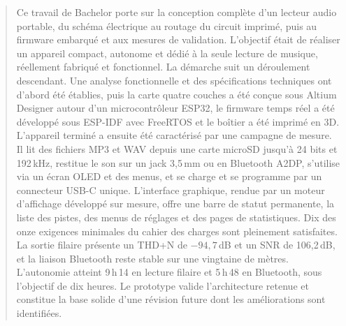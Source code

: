 \begin{abstract}

    Ce travail de Bachelor porte sur la conception complète d'un lecteur audio portable, du schéma électrique au routage du circuit imprimé, puis au firmware embarqué et aux mesures de validation. L'objectif était de réaliser un appareil compact, autonome et dédié à la seule lecture de musique, réellement fabriqué et fonctionnel. La démarche suit un déroulement descendant. Une analyse fonctionnelle et des spécifications techniques ont d'abord été établies, puis la carte quatre couches a été conçue sous Altium Designer autour d'un microcontrôleur ESP32, le firmware temps réel a été développé sous ESP-IDF avec FreeRTOS et le boîtier a été imprimé en 3D. L'appareil terminé a ensuite été caractérisé par une campagne de mesure. Il lit des fichiers MP3 et WAV depuis une carte microSD jusqu'à 24 bits et 192\,kHz, restitue le son sur un jack 3,5\,mm ou en Bluetooth A2DP, s'utilise via un écran OLED et des menus, et se charge et se programme par un connecteur USB-C unique. L'interface graphique, rendue par un moteur d'affichage développé sur mesure, offre une barre de statut permanente, la liste des pistes, des menus de réglages et des pages de statistiques. Dix des onze exigences minimales du cahier des charges sont pleinement satisfaites. La sortie filaire présente un THD+N de $-94{,}7$\,dB et un SNR de 106,2\,dB, et la liaison Bluetooth reste stable sur une vingtaine de mètres. L'autonomie atteint 9\,h\,14 en lecture filaire et 5\,h\,48 en Bluetooth, sous l'objectif de dix heures. Le prototype valide l'architecture retenue et constitue la base solide d'une révision future dont les améliorations sont identifiées.
    
    \asterism
    

\end{abstract}
